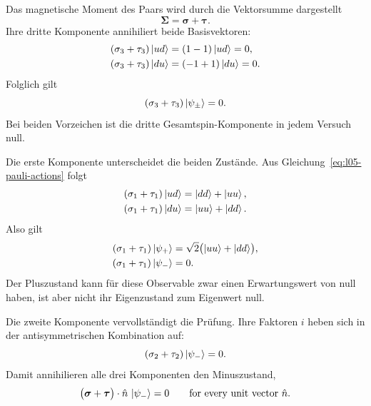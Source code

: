 Das magnetische Moment des Paars wird durch die Vektorsumme dargestellt
\begin{equation}
  \boldsymbol{\Sigma}
  =
  \boldsymbol{\sigma}+\boldsymbol{\tau}.
\end{equation}
Ihre dritte Komponente annihiliert beide Basisvektoren:
\begin{align}
  (\sigma_3+\tau_3)\left\lvert ud\right\rangle
  &=(1-1)\left\lvert ud\right\rangle=0,\nonumber\\
  (\sigma_3+\tau_3)\left\lvert du\right\rangle
  &=(-1+1)\left\lvert du\right\rangle=0.
\end{align}
Folglich gilt
\begin{equation}
  (\sigma_3+\tau_3)\left\lvert\psi_\pm\right\rangle=0.
\end{equation}
Bei beiden Vorzeichen ist die dritte Gesamtspin-Komponente in jedem Versuch null.

Die erste Komponente unterscheidet die beiden Zustände. Aus Gleichung~\eqref{eq:l05-pauli-actions} folgt
\begin{align}
  (\sigma_1+\tau_1)\left\lvert ud\right\rangle
  &=\left\lvert dd\right\rangle+\left\lvert uu\right\rangle,\nonumber\\
  (\sigma_1+\tau_1)\left\lvert du\right\rangle
  &=\left\lvert uu\right\rangle+\left\lvert dd\right\rangle.
\end{align}
Also gilt
\begin{align}
  (\sigma_1+\tau_1)\left\lvert\psi_+\right\rangle
  &=
  \sqrt2\bigl(\left\lvert uu\right\rangle+\left\lvert dd\right\rangle\bigr),\nonumber\\
  (\sigma_1+\tau_1)\left\lvert\psi_-\right\rangle
  &=0.
  \label{eq:l05-total-x}
\end{align}
Der Pluszustand kann für diese Observable zwar einen Erwartungswert von null haben, ist aber nicht ihr Eigenzustand zum Eigenwert null.

\begin{classroomqa}
\end{classroomqa}

Die zweite Komponente vervollständigt die Prüfung. Ihre Faktoren \(i\) heben sich in der antisymmetrischen Kombination auf:
\begin{equation}
  (\sigma_2+\tau_2)\left\lvert\psi_-\right\rangle=0.
\end{equation}
Damit annihilieren alle drei Komponenten den Minuszustand,
\begin{equation}
  \bigl(\boldsymbol{\sigma}+\boldsymbol{\tau}\bigr)
  \cdot\hat n\,\left\lvert\psi_-\right\rangle=0
  \qquad\text{for every unit vector }\hat n.
  \label{eq:l05-singlet-any-axis}
\end{equation}

